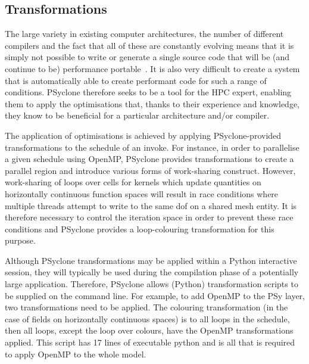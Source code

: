 \documentclass[review,times]{elsarticle}
\begin{document}
\subsection{Transformations}

The large variety in existing computer architectures, the number of
different compilers and the fact that all of these are constantly
evolving means that it is simply not possible to write or generate a
single source code that will be (and continue to be) performance
portable~\cite{shallow_psykal, nemolite2d_psykal}.  It is also very
difficult to create a system that is automatically able to create
performant code for such a range of conditions. PSyclone therefore
seeks to be a tool for the HPC expert, enabling them to apply the
optimisations that, thanks to their experience and knowledge, they
know to be beneficial for a particular architecture and/or compiler.

The application of optimisations is achieved by applying
PSyclone-provided transformations to the schedule of an invoke.  For
instance, in order to parallelise a given schedule using OpenMP,
 PSyclone provides transformations to create a parallel region and
introduce various forms of work-sharing construct. However,
work-sharing of loops over cells for kernels which update quantities
on horizontally continuous function spaces will result in race
conditions where multiple threads attempt to write to the same dof on
a shared mesh entity. It
is therefore necessary to control the iteration space in order to
prevent these race conditions and PSyclone provides a loop-colouring
transformation for this purpose.

Although PSyclone transformations may be applied within a Python
interactive session, they will typically be used during the
compilation phase of a potentially large application. Therefore,
PSyclone allows (Python) transformation scripts to be supplied
on the command line. For example, to add OpenMP to the PSy layer,
two transformations need to be applied. The colouring transformation
(in the case of fields on horizontally continuous spaces) is to all
loops in the schedule, then all loops, except the loop over colours,
have the OpenMP transformations applied. This script has 17 lines of
executable python and is all that is required to apply OpenMP to the
whole model. 
\end{document}

